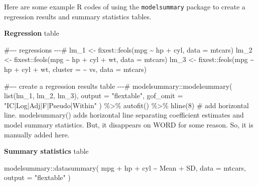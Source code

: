 \documentclass[
  letterpaper,
  DIV=11,
  numbers=noendperiod]{scrreprt}
\newenvironment{Shaded}{\begin{snugshade}}{\end{snugshade}}
\newcommand{\AttributeTok}[1]{\textcolor[rgb]{0.40,0.45,0.13}{#1}}
\newcommand{\CommentTok}[1]{\textcolor[rgb]{0.37,0.37,0.37}{#1}}
\newcommand{\DecValTok}[1]{\textcolor[rgb]{0.68,0.00,0.00}{#1}}
\newcommand{\FunctionTok}[1]{\textcolor[rgb]{0.28,0.35,0.67}{#1}}
\newcommand{\NormalTok}[1]{\textcolor[rgb]{0.00,0.23,0.31}{#1}}
\newcommand{\OtherTok}[1]{\textcolor[rgb]{0.00,0.23,0.31}{#1}}
\newcommand{\SpecialCharTok}[1]{\textcolor[rgb]{0.37,0.37,0.37}{#1}}
\newcommand{\StringTok}[1]{\textcolor[rgb]{0.13,0.47,0.30}{#1}}
\begin{document}
Here are some example R codes of using the \texttt{modelsummary} package
to create a regression results and summary statistics tables.

\textbf{Regression} table

\begin{Shaded}
\begin{Highlighting}[]
\CommentTok{\#{-}{-}{-} regressions {-}{-}{-}\#}
\NormalTok{lm\_1 }\OtherTok{\textless{}{-}}\NormalTok{ fixest}\SpecialCharTok{::}\FunctionTok{feols}\NormalTok{(mpg }\SpecialCharTok{\textasciitilde{}}\NormalTok{ hp }\SpecialCharTok{+}\NormalTok{ cyl, }\AttributeTok{data =}\NormalTok{ mtcars)}
\NormalTok{lm\_2 }\OtherTok{\textless{}{-}}\NormalTok{ fixest}\SpecialCharTok{::}\FunctionTok{feols}\NormalTok{(mpg }\SpecialCharTok{\textasciitilde{}}\NormalTok{ hp }\SpecialCharTok{+}\NormalTok{ cyl }\SpecialCharTok{+}\NormalTok{ wt, }\AttributeTok{data =}\NormalTok{ mtcars)}
\NormalTok{lm\_3 }\OtherTok{\textless{}{-}}\NormalTok{ fixest}\SpecialCharTok{::}\FunctionTok{feols}\NormalTok{(mpg }\SpecialCharTok{\textasciitilde{}}\NormalTok{ hp }\SpecialCharTok{+}\NormalTok{ cyl }\SpecialCharTok{+}\NormalTok{ wt, }\AttributeTok{cluster =} \SpecialCharTok{\textasciitilde{}}\NormalTok{ vs, }\AttributeTok{data =}\NormalTok{ mtcars)}

\CommentTok{\#{-}{-}{-} create a regression results table {-}{-}{-}\#}
\NormalTok{modelsummary}\SpecialCharTok{::}\FunctionTok{modelsummary}\NormalTok{(}
  \FunctionTok{list}\NormalTok{(lm\_1, lm\_2, lm\_3),}
  \AttributeTok{output =} \StringTok{"flextable"}\NormalTok{,}
  \AttributeTok{gof\_omit =} \StringTok{"IC|Log|Adj|F|Pseudo|Within"}
\NormalTok{) }\SpecialCharTok{\%\textgreater{}\%}
  \FunctionTok{autofit}\NormalTok{() }\SpecialCharTok{\%\textgreater{}\%}
  \FunctionTok{hline}\NormalTok{(}\DecValTok{8}\NormalTok{) }\CommentTok{\# add horizontal line. modelsummary() adds horizontal line separating coefficient estimates and model summary statistics. But, it disappears on WORD for some reason. So, it is manually added here.}
\end{Highlighting}
\end{Shaded}

\textbf{Summary statistics} table

\begin{Shaded}
\begin{Highlighting}[]
\NormalTok{modelsummary}\SpecialCharTok{::}\FunctionTok{datasummary}\NormalTok{(}
\NormalTok{  mpg }\SpecialCharTok{+}\NormalTok{ hp }\SpecialCharTok{+}\NormalTok{ cyl }\SpecialCharTok{\textasciitilde{}}\NormalTok{ Mean }\SpecialCharTok{+}\NormalTok{ SD,}
  \AttributeTok{data =}\NormalTok{ mtcars,}
  \AttributeTok{output =} \StringTok{"flextable"}
\NormalTok{)}
\end{Highlighting}
\end{Shaded}
\end{document}

